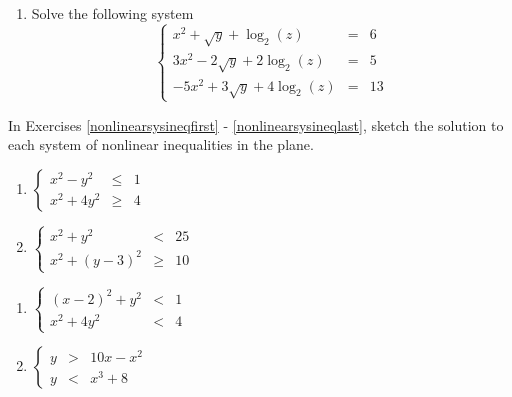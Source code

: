 \begin{enumerate}
\setcounter{enumi}{\value{HW}}

\item Solve the following system \[\left\{\begin{array}{rcr}  x^{2} + \sqrt{y} + \log_{2}(z) & = & 6 \\[3pt] 3x^{2} - 2\sqrt{y} + 2\log_{2}(z) & = & 5 \\[3pt] -5x^{2} + 3\sqrt{y} + 4\log_{2}(z) & = & 13 \end{array} \right.\]

\setcounter{HW}{\value{enumi}}
\end{enumerate}


In Exercises \ref{nonlinearsysineqfirst} - \ref{nonlinearsysineqlast}, sketch the solution to each system of nonlinear inequalities in the plane.


\begin{multicols}{2}
\begin{enumerate}
\setcounter{enumi}{\value{HW}}


\item $\left\{\begin{array}{rcr}  x^{2} - y^{2} & \leq & 1 \\ x^{2} + 4y^{2} & \geq & 4  \end{array} \right.$ \label{nonlinearsysineqfirst}
\item $\left\{\begin{array}{rcr}  x^{2} + y^{2} & < & 25 \\ x^{2} + (y - 3)^{2} & \geq & 10  \end{array} \right.$

\setcounter{HW}{\value{enumi}}
\end{enumerate}
\end{multicols}

\begin{multicols}{2}
\begin{enumerate}
\setcounter{enumi}{\value{HW}}

\item $\left\{\begin{array}{rcr}  (x - 2)^{2} + y^{2} & < & 1 \\ x^{2} + 4y^{2} & < & 4  \end{array} \right.$
\item $\left\{\begin{array}{rcr}  y & > & 10x - x^{2} \\ y & < & x^{3} + 8  \end{array} \right.$

\setcounter{HW}{\value{enumi}}
\end{enumerate}
\end{multicols}

